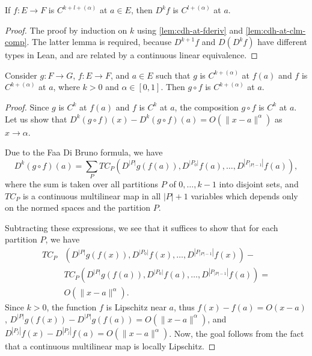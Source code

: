 \begin{corollary}%
  \label{lem:cdh-at-iteratedFDeriv}
  \leanok%
  If \(f \colon E \to F\) is \(C^{k+l+(\alpha)}\) at \(a \in E\),
  then \(D^{k}f\) is \(C^{l+(\alpha)}\) at \(a\).
\end{corollary}
\begin{proof}
  \leanok%
  The proof by induction on \(k\) using \autoref{lem:cdh-at-fderiv} and \autoref{lem:cdh-at-clm-comp}.
  The latter lemma is required, because \(D^{k+1}f\) and \(D(D^{k} f)\) have different types in Lean,
  and are related by a continuous linear equivalence.
\end{proof}

\begin{lemma}%
  \label{lem:cdh-at-comp}
  \leanok%
  Consider \(g\colon F \to G\), \(f\colon E \to F\), and \(a \in E\)
  such that \(g\) is \(C^{k+(\alpha)}\) at \(f(a)\) and \(f\) is \(C^{k+(\alpha)}\) at \(a\), where \(k > 0\) and \(\alpha \in [0, 1]\).
  Then \(g\circ f\) is \(C^{k+(\alpha)}\) at \(a\).
\end{lemma}

\begin{proof}
  \leanok%
  Since \(g\) is \(C^{k}\) at \(f(a)\) and \(f\) is \(C^{k}\) at \(a\),
  the composition \(g\circ f\) is \(C^{k}\) at \(a\).
  Let us show that \(D^{k}(g\circ f)(x) - D^{k}(g\circ f)(a) = O(\|x - a\|^{\alpha})\) as \(x\to \alpha\).

  Due to the Faa Di Bruno formula, we have
  \[
    D^k(g\circ f)(a) = \sum_{P}TC_{P}\left(D^{|P|}g(f(a)), D^{|P_{0}|}f(a), \dots, D^{\left|P_{|P|-1}\right|}f(a)\right),
  \]
  where the sum is taken over all partitions \(P\) of \(0, \dots, k - 1\) into disjoint sets,
  and \(TC_{P}\) is a continuous multilinear map in all \(|P|+1\) variables
  which depends only on the normed spaces and the partition \(P\).

  Subtracting these expressions, we see that it suffices to show that for each partition \(P\),
  we have
  \begin{align*}
    TC_{P}&\left(D^{|P|}g(f(x)), D^{|P_{0}|}f(x), \dots, D^{\left|P_{|P|-1}\right|}f(x)\right) -\\
          &TC_{P}\left(D^{|P|}g(f(a)), D^{|P_{0}|}f(a), \dots, D^{\left|P_{|P|-1}\right|}f(a)\right) =\\
          &O(\|x - a\|^{\alpha}).
  \end{align*}
  Since \(k > 0\), the function \(f\) is Lipschitz near \(a\),
  thus \(f(x) - f(a) = O(x - a)\), \(D^{|P|}g(f(x)) - D^{|P|}g(f(a)) = O(\|x - a\|^{\alpha})\), and \(D^{|P_{j}|}f(x) - D^{|P_{j}|}f(a) = O(\|x - a\|^{\alpha})\).
  Now, the goal follows from the fact that a continuous multilinear map is locally Lipschitz.
\end{proof}

